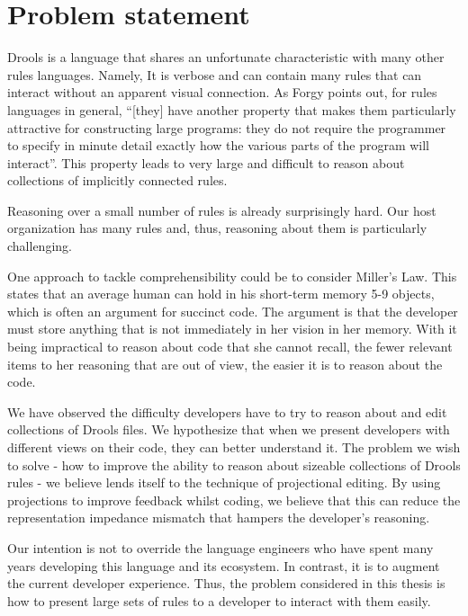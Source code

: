 \section{Problem statement}

Drools is a language that shares an unfortunate characteristic with many other rules languages.
Namely, It is verbose and can contain many rules that can interact without an apparent visual connection.
As Forgy\cite{forgy1989rete} points out, for rules languages in general, ``[they] have another property that makes them particularly attractive for constructing large programs: they do not require the programmer to specify in minute detail exactly how the various parts of the program will interact''.
This property leads to very large and difficult to reason about collections of implicitly connected rules.

Reasoning over a small number of rules is already surprisingly hard.
Our host organization has many rules and, thus, reasoning about them is particularly challenging.

One approach to tackle comprehensibility could be to consider Miller's Law\cite{miller1956magical}.
This states that an average human can hold in his short-term memory 5-9 objects, which is often an argument for succinct code.
The argument is that the developer must store anything that is not immediately in her vision in her memory.
With it being impractical to reason about code that she cannot recall, the fewer relevant items to her reasoning that are out of view, the easier it is to reason about the code.

We have observed the difficulty developers have to try to reason about and edit collections of Drools files.
We hypothesize that when we present developers with different views on their code, they can better understand it.
The problem we wish to solve - how to improve the ability to reason about sizeable collections of Drools rules - we believe lends itself to the technique of projectional editing.
By using projections to improve feedback whilst coding, we believe that this can reduce the representation impedance mismatch that hampers the developer's reasoning.

Our intention is not to override the language engineers who have spent many years developing this language and its ecosystem.
In contrast, it is to augment the current developer experience.
Thus, the problem considered in this thesis is how to present large sets of rules to a developer to interact with them easily. 